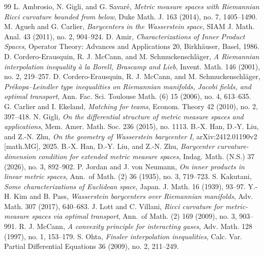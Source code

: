 \documentclass[10pt,a4paper]{amsart}
\numberwithin{equation}{section}
\begin{document}
\begin{thebibliography}{99}
 L. Ambrosio, N. Gigli, and G. Savar\'e, \emph{Metric measure spaces with Riemannian Ricci curvature bounded from below}, Duke Math. J. 163 (2014), no. 7, 1405--1490.
 M. Agueh and G. Carlier, \emph{Barycenters in the Wasserstein space}, SIAM J. Math. Anal. 43 (2011), no. 2, 904--924.
 D. Amir, \emph{Characterizations of Inner Product Spaces}, Operator Theory: Advances and Applications 20, Birkh\"auser, Basel, 1986.
 D. Cordero-Erausquin, R. J. McCann, and M. Schmuckenschl\"ager, \emph{A Riemannian interpolation inequality \`a la Borell, Brascamp and Lieb}, Invent. Math. 146 (2001), no. 2, 219--257.
 D. Cordero-Erausquin, R. J. McCann, and M. Schmuckenschl\"ager, \emph{Pr\'ekopa--Leindler type inequalities on Riemannian manifolds, Jacobi fields, and optimal transport}, Ann. Fac. Sci. Toulouse Math. (6) 15 (2006), no. 4, 613--635.
 G. Carlier and I. Ekeland, \emph{Matching for teams}, Econom. Theory 42 (2010), no. 2, 397--418.
 N. Gigli, \emph{On the differential structure of metric measure spaces and applications}, Mem. Amer. Math. Soc. 236 (2015), no. 1113.
 B.-X. Han, D.-Y. Liu, and Z.-N. Zhu, \emph{On the geometry of Wasserstein barycenter I}, arXiv:2412.01190v2 [math.MG], 2025.
 B.-X. Han, D.-Y. Liu, and Z.-N. Zhu, \emph{Barycenter curvature-dimension condition for extended metric measure spaces}, Indag. Math. (N.S.) 37 (2026), no. 3, 892--902.
 P. Jordan and J. von Neumann, \emph{On inner products in linear metric spaces}, Ann.\ of Math. (2) 36 (1935), no. 3, 719--723.
 S. Kakutani, \emph{Some characterizations of Euclidean space}, Japan. J. Math. 16 (1939), 93--97.
 Y.-H. Kim and B. Pass, \emph{Wasserstein barycenters over Riemannian manifolds}, Adv. Math. 307 (2017), 640--683.
 J. Lott and C. Villani, \emph{Ricci curvature for metric-measure spaces via optimal transport}, Ann.\ of Math. (2) 169 (2009), no. 3, 903--991.
 R. J. McCann, \emph{A convexity principle for interacting gases}, Adv. Math. 128 (1997), no. 1, 153--179.
 S. Ohta, \emph{Finsler interpolation inequalities}, Calc. Var. Partial Differential Equations 36 (2009), no. 2, 211--249.

\end{thebibliography}
\end{document}
